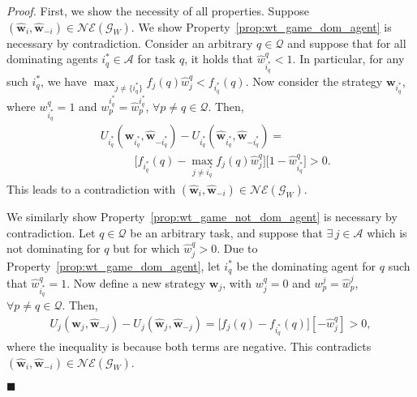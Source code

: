 \documentclass{IEEEtran}
\newcommand{\Mcal}[1]{\mathcal{#1}}
\newcommand{\Mc}[1]{\mathcal{#1}}
\newcommand{\bld}[1]{\mathbf{#1}}
\newcommand{\squaresym}{\hbox{$\blacksquare$}}
\newcommand{\proofend}{\relax\ifmmode\else\unskip\hfill\fi\squaresym}
\renewenvironment{proof}{\textit{Proof.} }{\proofend}
\renewcommand{\hat}[1]{\widehat{#1}}
\newcommand{\marginn}[1]{\marginpar{\color{blue}\tiny\ttfamily#1}}
\newcommand{\margin}[1]{\marginpar{\color{magenta}\tiny\ttfamily#1}}
\def \agt{\Mcal{A}}
\def \game{\mathscr{G}}
\def \ne{\Mc{NE}}
\def \tsk{\Mc{Q}}
\def \w{\bld{w}}
\def \wh{\hat{\w}}
\def \what{\hat{w}}
\begin{document}
\begin{proof}
First, we show the necessity of all properties. Suppose $(\hat{\w}_i,\hat{\w}_{-i}) \in \ne(\game_W)$. %
We show Property~\ref{prop:wt_game_dom_agent} is necessary by contradiction. Consider an arbitrary $q \in \tsk$ and suppose that for all dominating agents $i^*_q \in \agt$  for task $q$, it holds that $\what^q_{i^*_q} < 1$. In particular, for any such $i^*_q$, we have $\max_{j \neq \{i^*_q\}}f_j(q)\what^q_j < f_{i^*_q}(q)$. %
Now consider the strategy $\w_{i^*_q}$, where $w^q_{i^*_q} = 1$
and $w^{i^*_q}_p = \what^{i^*_q}_p$, $\forall p \neq q \in \tsk$. Then,
\begin{align*}
	& U_{i^*_q}(\w_{i^*_q},\wh_{-i^*_q}) - U_{i^*_q}(\wh_{i^*_q},\wh_{-i^*_q}) = \\
	& \hspace{3em} \Big[ f_{i^*_q}(q) - \max_{j \neq i^*_q} f_j(q)\what^q_j \Big] \big[ 1 -  \what^q_{i^*_q} \big] > 0.
\end{align*} 
This leads to a contradiction with $(\hat{\w}_i,\hat{\w}_{-i}) \in \ne(\game_W)$.

We similarly show Property~\ref{prop:wt_game_not_dom_agent} is necessary by contradiction. Let $q \in \tsk$ be an arbitrary task, and suppose that $\exists \,j \in \agt$ which is not dominating for $q$ but for which $\what^q_j > 0$. Due to Property~\ref{prop:wt_game_dom_agent}, let $i^*_q$ be the dominating agent for $q$ such that $\what^q_{i^*_q} = 1$. Now define a new strategy $\w_j$, with $w^q_j = 0$ and $w^j_p = \what^j_p$, $\forall p \neq q \in \tsk$. Then,
\begin{align*}
	U_j(\w_j,\wh_{-j}) - U_j(\wh_{j},\wh_{-j}) = 
	 \big[f_j(q) - f_{i^*_q}(q) \big] [- \what^q_j ] > 0, 
\end{align*} 
where the inequality is because both terms are negative. This
contradicts $(\hat{\w}_i,\hat{\w}_{-i}) \in
\ne(\game_W)$. %


\end{proof}
\end{document}
